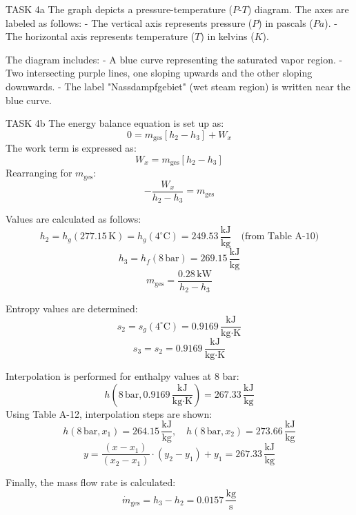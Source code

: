 TASK 4a  
The graph depicts a pressure-temperature (\(P\)-\(T\)) diagram. The axes are labeled as follows:  
- The vertical axis represents pressure (\(P\)) in pascals (\(Pa\)).  
- The horizontal axis represents temperature (\(T\)) in kelvins (\(K\)).  

The diagram includes:  
- A blue curve representing the saturated vapor region.  
- Two intersecting purple lines, one sloping upwards and the other sloping downwards.  
- The label "Nassdampfgebiet" (wet steam region) is written near the blue curve.  

TASK 4b  
The energy balance equation is set up as:  
\[
0 = m_{\text{ges}} \left[ h_2 - h_3 \right] + W_x
\]  
The work term is expressed as:  
\[
W_x = m_{\text{ges}} \left[ h_2 - h_3 \right]
\]  
Rearranging for \(m_{\text{ges}}\):  
\[
-\frac{W_x}{h_2 - h_3} = m_{\text{ges}}
\]  

Values are calculated as follows:  
\[
h_2 = h_g(277.15 \, \text{K}) = h_g(4^\circ\text{C}) = 249.53 \, \frac{\text{kJ}}{\text{kg}} \quad \text{(from Table A-10)}
\]  
\[
h_3 = h_f(8 \, \text{bar}) = 269.15 \, \frac{\text{kJ}}{\text{kg}}
\]  
\[
m_{\text{ges}} = \frac{0.28 \, \text{kW}}{h_2 - h_3}
\]  

Entropy values are determined:  
\[
s_2 = s_g(4^\circ\text{C}) = 0.9169 \, \frac{\text{kJ}}{\text{kg·K}}
\]  
\[
s_3 = s_2 = 0.9169 \, \frac{\text{kJ}}{\text{kg·K}}
\]  

Interpolation is performed for enthalpy values at 8 bar:  
\[
h(8 \, \text{bar}, 0.9169 \, \frac{\text{kJ}}{\text{kg·K}}) = 267.33 \, \frac{\text{kJ}}{\text{kg}}
\]  
Using Table A-12, interpolation steps are shown:  
\[
h(8 \, \text{bar}, x_1) = 264.15 \, \frac{\text{kJ}}{\text{kg}}, \quad h(8 \, \text{bar}, x_2) = 273.66 \, \frac{\text{kJ}}{\text{kg}}
\]  
\[
y = \frac{(x - x_1)}{(x_2 - x_1)} \cdot (y_2 - y_1) + y_1 = 267.33 \, \frac{\text{kJ}}{\text{kg}}
\]  

Finally, the mass flow rate is calculated:  
\[
\dot{m}_{\text{ges}} = h_3 - h_2 = 0.0157 \, \frac{\text{kg}}{\text{s}}
\]